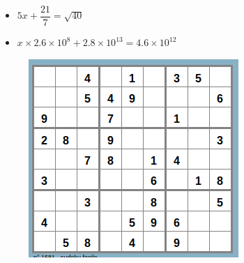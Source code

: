 \begin{multicols}{2}
  \begin{itemize}[label={$\bullet$}]
\item $5x + \dfrac{21}{7} = \sqrt{40}$ \\ \Pointilles[10]  \columnbreak 
\item $x \times 2.6 \times 10^{8} +  2.8 \times 10^{13} = 4.6 \times 10^{12}$ \\ \Pointilles[10]
\end{itemize} 
\end{multicols}

\begin{figure}[H]
  \centering
  \includegraphics[width=0.6\linewidth]{4x6-equations/sudoku-9a.png}
\end{figure}

